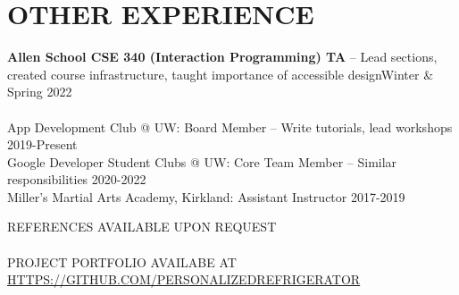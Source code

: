 \documentclass[12pt,letterpaper]{extarticle}
\begin{document}
  \section{OTHER EXPERIENCE}
  \textbf{Allen School CSE 340 (Interaction Programming) TA} -- {\footnotesize Lead sections, created course infrastructure, taught importance of accessible design}\hfill Winter \& Spring 2022\\\;\\
  App Development Club @ UW: Board Member -- {\footnotesize Write tutorials, lead workshops} \hfill 2019-Present\\
  Google Developer Student Clubs @ UW: Core Team Member -- {\footnotesize Similar responsibilities} \hfill 2020-2022\\
  Miller's Martial Arts Academy, Kirkland: Assistant Instructor \hfill 2017-2019

  \begin{center}
    REFERENCES AVAILABLE UPON REQUEST\\\phantom{;}\\
    PROJECT PORTFOLIO AVAILABE AT \url{HTTPS://GITHUB.COM/PERSONALIZEDREFRIGERATOR}
  \end{center}
\end{document}
